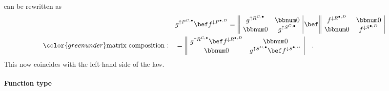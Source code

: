 can be rewritten as
\begin{align*}
 & g^{\uparrow P^{C,\bullet}}\bef f^{\downarrow P^{\bullet,D}}=\,\begin{array}{||cc|}
g^{\uparrow R^{C,\bullet}} & \bbnum 0\\
\bbnum 0 & g^{\uparrow S^{C,\bullet}}
\end{array}\,\bef\,\begin{array}{||cc|}
f^{\downarrow R^{\bullet,D}} & \bbnum 0\\
\bbnum 0 & f^{\downarrow S^{\bullet,D}}
\end{array}\\
{\color{greenunder}\text{matrix composition}:}\quad & =\,\begin{array}{||cc|}
g^{\uparrow R^{C,\bullet}}\bef f^{\downarrow R^{\bullet,D}} & \bbnum 0\\
\bbnum 0 & g^{\uparrow S^{C,\bullet}}\bef f^{\downarrow S^{\bullet,D}}
\end{array}\quad.
\end{align*}
This now coincides with the left-hand side of the law.

\paragraph{Function type}

